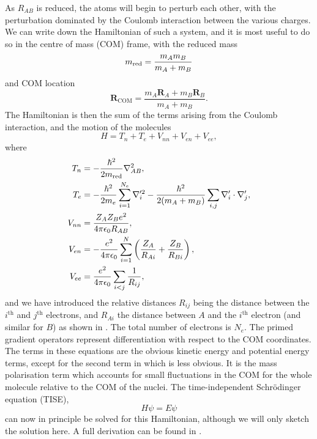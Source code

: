 As $R_{AB}$ is reduced, the atoms will begin to perturb each other, with the
perturbation dominated by the Coulomb interaction between the various charges.
We can write down the Hamiltonian of such a system, and it is most useful to do
so in the centre of mass (COM) frame, with the reduced mass
%
\begin{equation}
  m_\text{red}{} = \frac{m_A m_B}{m_A + m_B}
\end{equation}
%
and COM location
%
\begin{equation}
  \mathbf{R}_\text{COM} = \frac{m_A \mathbf{R}_A + m_B \mathbf{R}_B}{m_A+m_B}.
\end{equation}
%
The Hamiltonian is then the sum of the terms arising from the Coulomb
interaction, and the motion of the molecules
%
\begin{equation}
  H = T_n + T_e + V_{nn} + V_{en} + V_{ee},
\end{equation}
%
where
%
\begin{align}
  T_n &= -\frac{\hbar^2}{2m_\text{red}{}}\nabla_{AB}^2,\\
  T_e &= -\frac{\hbar^2}{2 m_e}\sum_{i=1}^{N_e} \nabla_i'^2 -
  \frac{\hbar^2}{2(m_A + m_B)}\sum_{i, j} \nabla'_i \cdot \nabla'_j, \\
  \label{theory:eqn:mpterm}
  V_{nn} &= \frac{Z_A Z_B e^2}{4\pi\epsilon_0 R_{AB}}, \\
  V_{en} &= - \frac{e^2}{4\pi\epsilon_0}\sum_{i=1}^N \left(\frac{Z_A}{R_{Ai}} + \frac{Z_B}{R_{Bi}}\right), \\
  V_{ee} &= \frac{e^2}{4\pi\epsilon_0}\sum_{i<j} \frac{1}{R_{ij}},
\end{align}
%
and we have introduced the relative distances $R_{ij}$ being the distance
between the $i^\text{th}$ and $j^\text{th}$ electrons, and $R_{Ai}$ the
distance between $A$ and the $i^\text{th}$ electron (and similar for $B$) as
shown in .  The total number of electrons is $N_e$.
The primed gradient operators represent differentiation with respect to the COM
coordinates.
%
The terms in these equations are the obvious kinetic energy and potential
energy terms, except for the second term in  which
is less obvious. It is the mass polarisation term which accounts for small
fluctuations in the COM for the whole molecule relative to the COM of the
nuclei.
%
The time-independent Schr\"odinger equation (TISE),
%
\begin{equation}
  H\psi = E\psi
\end{equation}
%
can now in principle be solved for this Hamiltonian, although we will only
sketch the solution here. A full derivation can be found in
.

